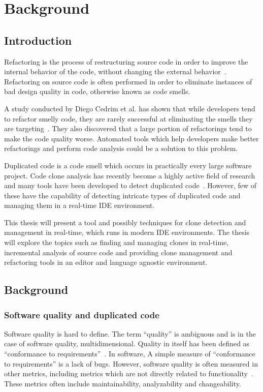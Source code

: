 \chapter{Background}

\section{Introduction}

Refactoring is the process of restructuring source code in order to improve the internal behavior
of the code, without changing the external behavior~\cite[9]{fowlerrefactoring}.
Refactoring on source code is often performed in order to eliminate instances of bad
design quality in code, otherwise known as code smells.

A study conducted by Diego Cedrim et al. has shown that while developers tend to refactor
smelly code, they are rarely successful at eliminating the smells they are
targeting~\cite{Rohit_Gheyi_Impact}. They also discovered that a large portion of
refactorings tend to make the code quality worse. Automated tools which help developers
make better refactorings and perform code analysis could be a solution to this problem.

Duplicated code is a code smell which occurs in practically every large software project.
Code clone analysis has recently become a highly active field of research and many tools
have been developed to detect duplicated code~\cite[7]{Inoue_introduction_to_cc}. However,
few of these have the capability of detecting intricate types of duplicated code and
managing them in a real-time IDE environment.

This thesis will present a tool and possibly techniques for clone detection and management
in real-time, which runs in modern IDE environments. The thesis will explore the topics
such as finding and managing clones in real-time, incremental analysis of source code and
providing clone management and refactoring tools in an editor and language
agnostic environment.

\section{Background}

\subsection{Software quality and duplicated code}

Software quality is hard to define. The term ``quality'' is ambiguous and is in the case
of software quality, multidimensional. Quality in itself has been defined as ``conformance
to requirements''~\cite[8]{crosby1980quality}. In software, A simple measure of
``conformance to requirements'' is a lack of bugs. However, software
quality is often measured in other metrics, including metrics which are not directly
related to functionality~\cite[29]{MetricsAndModelsInSoftwareQuality}. These metrics
often include maintainability, analyzability and changeability.


